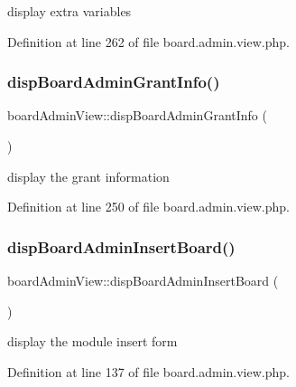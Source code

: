 display extra variables 



Definition at line 262 of file board.\+admin.\+view.\+php.

\hypertarget{classboardAdminView_ae184620e569347d639612054c6a2ccc5}{}\label{classboardAdminView_ae184620e569347d639612054c6a2ccc5} 
\subsubsection{\texorpdfstring{disp\+Board\+Admin\+Grant\+Info()}{dispBoardAdminGrantInfo()}}
{\footnotesize\ttfamily board\+Admin\+View\+::disp\+Board\+Admin\+Grant\+Info (\begin{DoxyParamCaption}{ }\end{DoxyParamCaption})}



display the grant information 



Definition at line 250 of file board.\+admin.\+view.\+php.

\hypertarget{classboardAdminView_a823448c68fe8c5d8f13b1854f6478c0d}{}\label{classboardAdminView_a823448c68fe8c5d8f13b1854f6478c0d} 
\subsubsection{\texorpdfstring{disp\+Board\+Admin\+Insert\+Board()}{dispBoardAdminInsertBoard()}}
{\footnotesize\ttfamily board\+Admin\+View\+::disp\+Board\+Admin\+Insert\+Board (\begin{DoxyParamCaption}{ }\end{DoxyParamCaption})}



display the module insert form 



Definition at line 137 of file board.\+admin.\+view.\+php.

\hypertarget{classboardAdminView_ac2b4c003bd4e65061984047ffe7cad5e}{}\label{classboardAdminView_ac2b4c003bd4e65061984047ffe7cad5e} 
